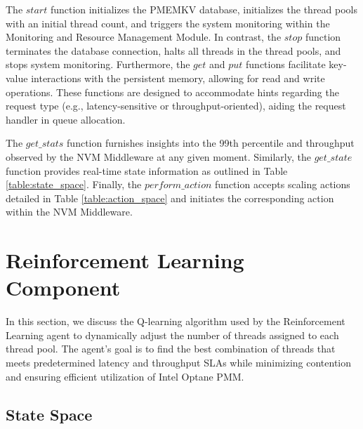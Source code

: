 The $start$ function initializes the PMEMKV database, initializes the thread pools with an initial thread count, and triggers the system monitoring within the Monitoring and Resource Management Module. In contrast, the $stop$ function terminates the database connection, halts all threads in the thread pools, and stops system monitoring. Furthermore, the $get$ and $put$ functions facilitate key-value interactions with the persistent memory, allowing for read and write operations. These functions are designed to accommodate hints regarding the request type (e.g., latency-sensitive or throughput-oriented), aiding the request handler in queue allocation.

The $get\_stats$ function furnishes insights into the 99th percentile and throughput observed by the NVM Middleware at any given moment. Similarly, the $get\_state$ function provides real-time state information as outlined in Table \ref{table:state_space}. Finally, the $perform\_action$ function accepts scaling actions detailed in Table \ref{table:action_space} and initiates the corresponding action within the NVM Middleware.

\section{Reinforcement Learning Component}

In this section, we discuss the Q-learning algorithm used by the Reinforcement Learning agent to dynamically adjust the number of threads assigned to each thread pool. The agent’s goal is to find the best combination of threads that meets predetermined latency and throughput SLAs while minimizing contention and ensuring efficient utilization of Intel Optane PMM. 


\subsection{State Space}

